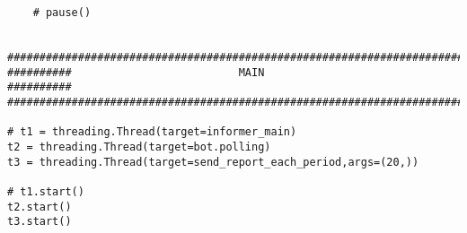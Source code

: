 \documentclass{article}
\begin{document}
\begin{lstlisting}
    # pause()


###############################################################################
##########                          MAIN                             ##########
###############################################################################

# t1 = threading.Thread(target=informer_main)
t2 = threading.Thread(target=bot.polling)
t3 = threading.Thread(target=send_report_each_period,args=(20,))

# t1.start()
t2.start()
t3.start()
\end{lstlisting}
\end{document}
